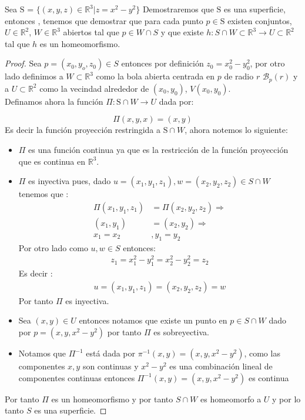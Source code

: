 \begin{example}

Sea $\mathrm{S}$ = $\{(x,y,z) \in \mathbb{R}^3 | z = x^2 - y^2 \}$
Demostraremos que $\mathrm{S}$ es una superficie, entonces , tenemos que demostrar que para cada punto $p \in \mathrm{S}$ existen conjuntos, $U \in \mathbb{R}^2$, $W \in \mathbb{R}^3$ abiertos tal que $p \in W \cap S$ y que existe $h: S\cap W \subset \mathbb{R}^3 \rightarrow U \subset \mathbb{R}^2$ tal que $h$ es un homeomorfismo.

\begin{proof}
    Sea $p = (x_0,y_o,z_0) \in S$ entonces por definición $ z_0 = x_0^2 - y_0^2$, por otro lado definimos a $W \subset \mathbb{R}^3$ como la bola abierta centrada en $p$ de radio $r$ $\mathcal{B}_p(r)$ y a $U \subset \mathbb{R}^2$ como la vecindad alrededor de $(x_0,y_0)$, $V(x_0,y_0)$.\\
    Definamos ahora la función $\Pi: \mathrm{S}\cap W \rightarrow U$ dada por:

    \[
    \Pi(x,y,x) = (x,y)
    \]
    Es decir la función proyección restringida a $\mathrm{S}\cap W$, ahora notemos lo siguiente:

    \begin{itemize}
        \item $\Pi$ es una función continua ya que es la restricción de la función proyección que es continua en $\mathbb{R}^3$.
        \item $\Pi$ es inyectiva pues, dado $u=(x_1,y_1,z_1),w=(x_2,y_2,z_2) \in S\cap W$ tenemos que :
        \begin{align*}
        \Pi(x_1,y_1,z_1) &= \Pi(x_2,y_2,z_2) \Rightarrow \\
        (x_1,y_1) &= (x_2,y_2) \Rightarrow \\
        x_1 = x_2 &, y_1 = y_2
        \end{align*}
        Por otro lado como $u,w \in S$ entonces:
        \begin{align*}
            z_1 = x_1^2 - y_1^2 = x_2^2 - y_2^2 = z_2
        \end{align*}
        Es decir :
        \begin{align*}
            u = (x_1,y_1,z_1) = (x_2,y_2,z_2) = w
        \end{align*}
        Por tanto $\Pi$ es inyectiva.
        \item Sea $(x,y) \in U$ entonces notamos que existe un punto en $p \in S \cap W$ dado por $p = (x,y,x^2-y^2)$ por tanto $\Pi$ es sobreyectiva.
        \item Notamos que $\Pi^{-1}$ está dada por $\pi^{-1}(x,y) = (x,y,x^2-y^2)$, como las componentes $x,y$ son continuas y $x^2 - y^2$ es una combinación lineal de componentes continuas entonces $\Pi ^{-1}(x,y)=(x,y,x^2 - y^2)$ es continua
    \end{itemize}
    Por tanto $\Pi$ es un homeomorfismo y por tanto $S \cap W$ es homeomorfo a $U$ y por lo tanto $S$ es una superficie.
\end{proof}



\end{example}

